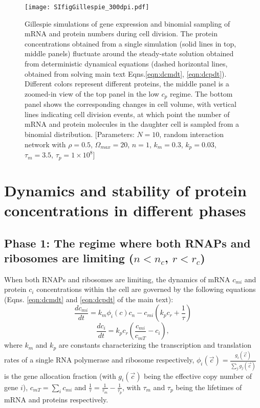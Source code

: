 \documentclass[10pt]{article}
\begin{document}
\begin{figure}[!htb]
    \centering
	\texttt{[image: SIfigGillespie\_300dpi.pdf]}
    \caption{Gillespie simulations of gene expression and binomial sampling of mRNA and protein numbers during cell division. The protein concentrations obtained from a single simulation (solid lines in top, middle panels) fluctuate around the steady-state solution obtained from deterministic dynamical equations (dashed horizontal lines, obtained from solving main text Eqns.\ref{eqn:dcmdt}, \ref{eqn:dcpdt}).  Different colors represent different proteins, the middle panel is a zoomed-in view of the top panel in the low $c_p$ regime. The bottom panel shows the corresponding changes in cell volume, with vertical lines indicating cell division events, at which point the number of mRNA and protein molecules in the daughter cell is sampled from a binomial distribution.  [Parameters: $N = 10$, random interaction network with $\rho = 0.5$, $\Omega_{max} = 20$, $n = 1$, $k_m = 0.3$, $k_p = 0.03$, $\tau_m = 3.5$, $\tau_p = 1 \times 10^8$] }
    \label{SIfig:Gillespie}
\end{figure}

\section{Dynamics and stability of protein concentrations in different phases}
\label{sec:differentphases}

\subsection{Phase 1: The regime where both RNAPs and ribosomes are limiting ($n < n_c$, $r < r_c$)}

When both RNAPs and ribosomes are limiting, the dynamics of mRNA $c_{mi}$ and protein $c_i$ concentrations within the cell are governed by the following equations (Eqns. \ref{eqn:dcmdt} and \ref{eqn:dcpdt} of the main text):
\begin{equation}
    \frac{dc_{mi}}{dt} = k_m \phi_i({c}) c_n - c_{mi} \left(k_p c_r + \frac{1}{\tau}\right)
\end{equation}
\begin{equation}
    \frac{dc_i}{dt} = k_p c_r \left( \frac{c_{mi}}{c_{mT}} - c_i \right),
\end{equation}
where $k_m$ and $k_p$ are constants characterizing the transcription and translation rates of a single RNA polymerase and ribosome respectively, $\phi_i(\vec{c})= \frac{g_i(\vec{c})}{\sum_j g_j(\vec{c})}$ is the gene allocation fraction (with $g_i(\vec{c})$ being the effective copy number of gene $i$), $c_{mT} = \sum_i c_{mi}$ and $\frac{1}{\tau} = \frac{1}{\tau_m} - \frac{1}{\tau_p}$, with $\tau_m$ and $\tau_p$ being the lifetimes of mRNA and proteins respectively. 
\end{document}
